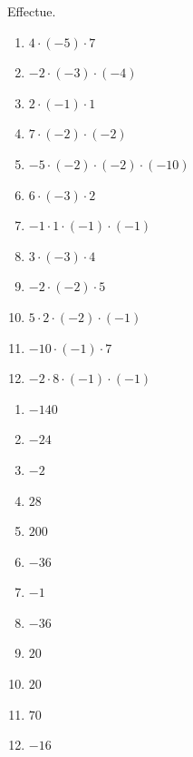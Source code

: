 \documentclass[../../syllabus_1.tex]{subfiles}
\begin{document}
\begin{exercise}
    Effectue.
    \begin{enumerate}[cols=3, itemsep=.3cm]
        \item \(4\cdot (-5) \cdot 7\)
        \item \(-2\cdot (-3)\cdot (-4)\)
        \item \(2\cdot (-1)\cdot 1\)
        \item \(7\cdot (-2)\cdot (-2)\)
        \item \(-5\cdot (-2)\cdot (-2)\cdot  (-10)\)
        \item \(6\cdot (-3) \cdot 2\)
        \item \(-1 \cdot 1 \cdot (-1) \cdot (-1)\)
        \item \(3\cdot (-3) \cdot 4\)
        \item \(-2\cdot (-2) \cdot 5\)
        \item \(5 \cdot 2 \cdot (-2) \cdot (-1)\)
        \item \(-10 \cdot (-1) \cdot 7\)
        \item \(-2 \cdot 8 \cdot (-1) \cdot (-1)\)
    \end{enumerate}
\end{exercise}
\begin{solution}
    \begin{enumerate}[cols=4]
        \item \(-140\)
        \item \(-24\)
        \item \(-2\)
        \item \(28\)
        \item \(200\)
        \item \(-36\)
        \item \(-1\)
        \item \(-36\)
        \item \(20\)
        \item \(20\)
        \item \(70\)
        \item \(-16\)
    \end{enumerate}
\end{solution}
\end{document}
